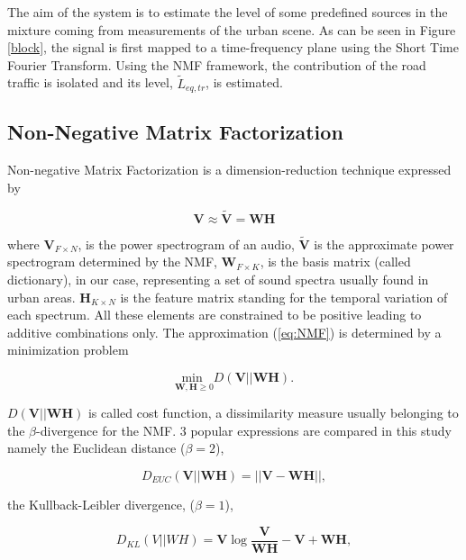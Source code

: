 \documentclass{article}
\begin{document}
\begin{sloppy}
The aim of the system is to estimate the level of some predefined sources in the mixture coming from measurements of the urban scene. As can be seen in Figure \ref{block}, the signal is first mapped to a time-frequency plane using the Short Time Fourier Transform. Using the NMF framework, the contribution of the road traffic is isolated and its level, $\tilde{L}_{eq,tr}$, is estimated.

\subsection{Non-Negative Matrix Factorization}

Non-negative Matrix Factorization is a dimension-reduction technique expressed by

\begin{equation}\label{eq:NMF}
\mathbf{V} \approx \mathbf{\tilde{V}} = \mathbf{WH}
\end{equation}

where $\mathbf{V}_{F \times N}$, is the power spectrogram of an audio, $\mathbf{\tilde{V}}$ is the approximate power spectrogram determined by the NMF, $\mathbf{W}_{F \times K}$, is the basis matrix (called dictionary), in our case, representing a set of sound spectra usually found in urban areas. $\mathbf{H}_{K \times N}$ is the feature matrix standing for the temporal variation of each spectrum. All these elements are constrained to be positive leading to additive combinations only. The approximation (\ref{eq:NMF}) is determined by a minimization problem

\begin{equation}\label{eq:minCost}
\underset{\mathbf{W},\mathbf{H} \geq 0}{\text{min }} D(\mathbf{V}\vert\vert \mathbf{WH}).
\end{equation}

$D(\mathbf{V}\vert\vert \mathbf{WH})$ is called cost function, a dissimilarity measure usually belonging to the $\beta$-divergence for the NMF. 3 popular expressions are compared in this study namely the Euclidean distance ($\beta = 2$),

\begin{equation}\label{eq:distEUC}
D_{EUC}(\mathbf{V} \vert \vert \mathbf{WH}) =  \vert\vert \mathbf{V} - \mathbf{WH} \vert\vert , 
\end{equation} 

the Kullback-Leibler divergence, ($\beta = 1$), 

\begin{equation}\label{eq:divKL}
D_{KL}(V\vert\vert WH) = \mathbf{V}\log\frac{\mathbf{V}}{\mathbf{WH}}-\mathbf{V}+\mathbf{WH},
\end{equation}


\end{sloppy}
\end{document}
